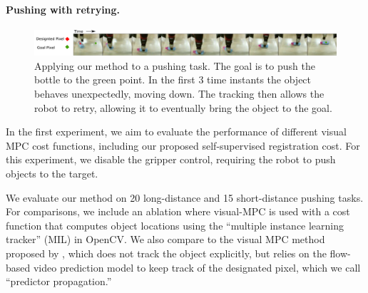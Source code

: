 \paragraph{Pushing with retrying.}
\begin{figure}
    \centering
    \includegraphics[width=1.0\textwidth]{images/push_correction.pdf}
    \caption{\small{Applying our method to a pushing task. The goal is to push the bottle to the green point. In the first 3 time instants the object behaves unexpectedly, moving down. The tracking then allows the robot to retry, allowing it to eventually bring the object to the goal.}}
    \label{fig:push_retry}
\end{figure}



In the first experiment, we aim to evaluate the performance of different visual MPC cost functions, including our proposed self-supervised registration cost. For this experiment, we disable the gripper control, requiring the robot to push objects to the target. 

We evaluate our method on 20 long-distance and 15 short-distance pushing tasks. For comparisons, we include an ablation where visual-MPC is used with a cost function that computes object locations using the ``multiple instance learning tracker'' (MIL) \cite{babenko2009visual} in OpenCV. 
We also compare to the visual MPC method proposed by \citet{sna},
which does not track the object explicitly, but relies on the flow-based video prediction model to keep track of the designated pixel, which we call ``predictor propagation.'' 

